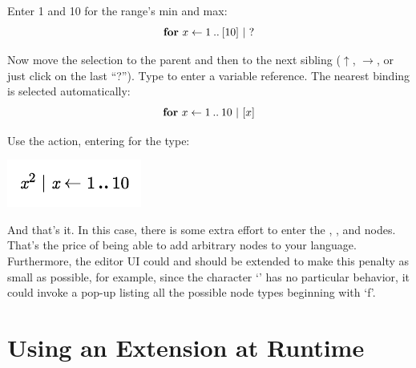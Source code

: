 Enter 1 and 10 for the range's min and max:
$$\textbf{for} \  x \leftarrow 1 \: .. \: [10] \ | \ ?$$

Now move the selection to the parent and then to the next sibling ($\uparrow$, $\rightarrow$, or just click on the last ``?''). Type  to enter a variable reference. The nearest binding is selected automatically:
$$\keyword{for} \  x \leftarrow 1 \: .. \: 10 \ | \ [x]$$

Use the  action, entering  for the type:
\begin{center}
\includegraphics{src/image/for.pdf}
\end{center}

And that's it. In this case, there is some extra effort to enter the , , and  nodes. That's the price of being able to add arbitrary nodes to your language. Furthermore, the editor UI could and should be extended to make this penalty as small as possible, for example, since the character `' has no particular behavior, it could invoke a pop-up listing all the possible node types beginning with `f'.


%
%
\section{Using an Extension at Runtime}

